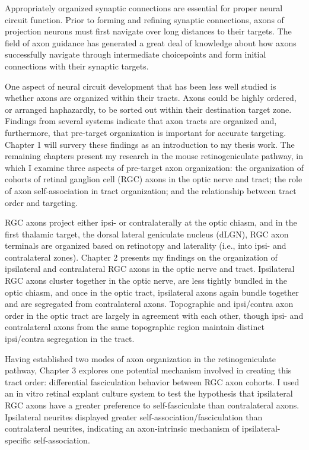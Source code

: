 Appropriately organized synaptic connections are essential for proper neural circuit function.
Prior to forming and refining synaptic connections, axons of projection neurons must first navigate over long distances to their targets.
The field of axon guidance has generated a great deal of knowledge about how axons successfully navigate through intermediate choicepoints and form initial connections with their synaptic targets.

One aspect of neural circuit development that has been less well studied is whether axons are organized within their tracts.
Axons could be highly ordered, or arranged haphazardly, to be sorted out within their destination target zone.
Findings from several systems indicate that axon tracts are organized and, furthermore, that pre-target organization is important for accurate targeting.
Chapter 1 will survery these findings as an introduction to my thesis work.
The remaining chapters present my research in the mouse retinogeniculate pathway, in which I examine three aspects of pre-target axon organization: the organization of cohorts of retinal ganglion cell (RGC) axons in the optic nerve and tract; the role of axon self-association in tract organization; and the relationship between tract order and targeting.

RGC axons project either ipsi- or contralaterally at the optic chiasm, and in the first thalamic target, the dorsal lateral geniculate nucleus (dLGN), RGC axon terminals are organized based on retinotopy and laterality (i.e., into ipsi- and contralateral zones).
Chapter 2 presents my findings on the organization of ipsilateral and contralateral RGC axons in the optic nerve and tract.
Ipsilateral RGC axons cluster together in the optic nerve, are less tightly bundled in the optic chiasm, and once in the optic tract, ipsilateral axons again bundle together and are segregated from contralateral axons.
Topographic and ipsi/contra axon order in the optic tract are largely in agreement with each other, though ipsi- and contralateral axons from the same topographic region maintain distinct ipsi/contra segregation in the tract.

Having established two modes of axon organization in the retinogeniculate pathway, Chapter 3 explores one potential mechanism involved in creating this tract order: differential fasciculation behavior between RGC axon cohorts.
I used an in vitro retinal explant culture system to test the hypothesis that ipsilateral RGC axons have a greater preference to self-fasciculate than contralateral axons.
Ipsilateral neurites displayed greater self-association/fasciculation than contralateral neurites, indicating an axon-intrinsic mechanism of ipsilateral-specific self-association. 


